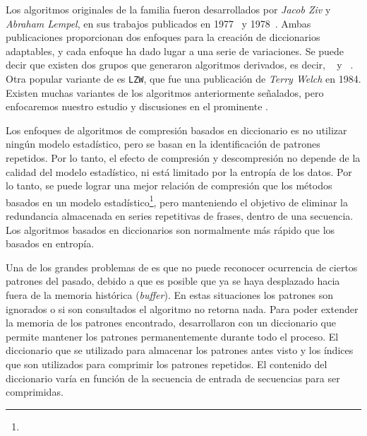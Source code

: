 %
% 
%

Los algoritmos originales de la familia fueron desarrollados por \emph{Jacob Ziv} y \emph{Abraham Lempel}, en sus trabajos publicados en 1977~\cite{ZivLempel1977} y 1978~\cite{ZivLempel1978}. Ambas publicaciones proporcionan dos enfoques para la creación de diccionarios adaptables, y cada enfoque ha dado lugar a una serie de variaciones. Se puede decir que existen dos grupos que generaron algoritmos derivados, es decir, \lzSieteSiete~\cite{ZivLempel1977} y \lzSieteOcho~\cite{ZivLempel1978}. Otra popular variante  de \lzSieteOcho es \texttt{LZW}, que fue una publicación de \emph{Terry Welch} en 1984. Existen muchas variantes de los algoritmos anteriormente señalados,  pero enfocaremos nuestro estudio y discusiones en el prominente \lzSieteOcho. 



Los enfoques de algoritmos de compresión basados en diccionario es no utilizar ningún modelo estadístico, pero se basan en la identificación de patrones repetidos. Por lo tanto, el efecto de compresión y descompresión no depende de la calidad del modelo estadístico, ni está limitado por la entropía de los datos. Por lo tanto, se puede lograr una mejor relación de compresión que los métodos basados en un modelo estadístico\footnote{\footnoteHuffman}, pero manteniendo el objetivo de eliminar la redundancia almacenada en series repetitivas de frases, dentro de una secuencia. Los algoritmos basados en diccionarios son normalmente más rápido que los basados en entropía. 

Una de los grandes problemas de \lzSieteSiete es que no puede reconocer ocurrencia de ciertos patrones del pasado, debido a que es posible que ya se haya desplazado hacia fuera de la memoria histórica (\emph{buffer}). En estas situaciones los patrones son ignorados o si son consultados el algoritmo no retorna nada. Para poder extender la memoria de los patrones encontrado, \lempelziv desarrollaron \lzSieteOcho con un diccionario que permite mantener los patrones permanentemente durante todo el proceso. El diccionario que se utilizado para almacenar los patrones antes visto  y los índices que son utilizados para comprimir los patrones repetidos. El contenido del diccionario varía en función de la secuencia de entrada de secuencias para ser comprimidas.


